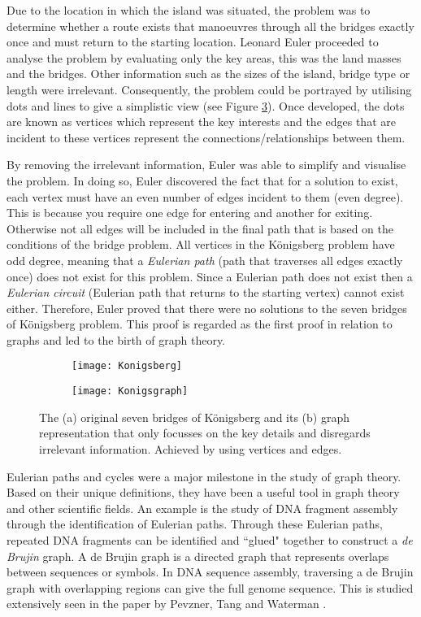 Due to the location in which the island was situated, the problem was to determine whether a route exists that manoeuvres through all the bridges exactly once and must return to the starting location. Leonard Euler proceeded to analyse the problem by evaluating only the key areas, this was the land masses and the bridges. Other information such as the sizes of the island, bridge type or length were irrelevant. Consequently, the problem could be portrayed by utilising dots and lines \cite{pryor2011seven} to give a simplistic view (see Figure \ref{fig:Königsberg's Graph}). Once developed, the dots are known as vertices which represent the key interests and the edges that are incident to these vertices represent the connections/relationships between them.

By removing the irrelevant information, Euler was able to simplify and visualise the problem. In doing so, Euler discovered the fact that for a solution to exist, each vertex must have an even number of edges incident to them (even degree). This is because you require one edge for entering and another for exiting. Otherwise not all edges will be included in the final path that is based on the conditions of the bridge problem. All vertices in the Königsberg problem have odd degree, meaning that a \emph{Eulerian path} (path that traverses all edges exactly once) does not exist for this problem. Since a Eulerian path does not exist then a \emph{Eulerian circuit} (Eulerian path that returns to the starting vertex) cannot exist either. Therefore, Euler proved that there were no solutions to the seven bridges of Königsberg problem. This proof is regarded as the first proof in relation to graphs and led to the birth of graph theory.

\begin{figure}[!htb]
\centering
\begin{subfigure}{.45\textwidth}
	\texttt{[image: Konigsberg]}
	\caption{}
	\label{fig:Königsberg's Bridges}
\end{subfigure}
\hfill
\begin{subfigure}{.45\textwidth}
	\texttt{[image: Konigsgraph]}
	\caption{}
	\label{fig:Königsberg's Graph}
\end{subfigure}
\caption{The (a) original seven bridges of Königsberg and its (b) graph representation that only focusses on the key details and disregards irrelevant information. Achieved by using vertices and edges.}
\end{figure}

Eulerian paths and cycles were a major milestone in the study of graph theory. Based on their unique definitions, they have been a useful tool in graph theory and other scientific fields. An example is the study of DNA fragment assembly through the identification of Eulerian paths. Through these Eulerian paths, repeated DNA fragments can be identified and ``glued" together to construct a \emph{de Brujin} graph. A de Brujin graph is a directed graph that represents overlaps between sequences or symbols. In DNA sequence assembly, traversing a de Brujin graph with overlapping regions can give the full genome sequence. This is studied extensively seen in the paper by Pevzner, Tang and Waterman \cite{pevzner2001eulerian}.

